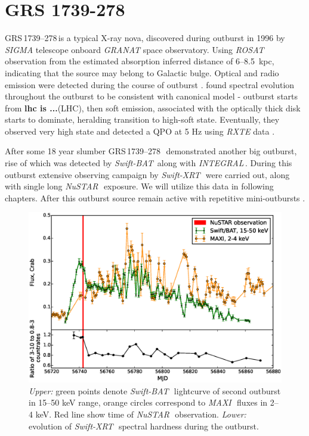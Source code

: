 \documentclass[a4paper,fleqn,usenatbib]{mnras}
\def\grs{{GRS\,1739--278\,}}
\def\swiftx{{\em Swift-XRT\,}}
\def\swiftb{{\em Swift-BAT\,}}
\def\nustar{{\em NuSTAR\,}}
\def\integral{{\em INTEGRAL\,}}
\def\maxi{{\em MAXI\,}}
\begin{document}
\section{GRS 1739-278}

\grs is a typical X-ray nova, discovered during outburst in 1996  \citep{paul96} by {\it SIGMA} \citep{paul91} telescope onboard {\it GRANAT} space observatory.
Using {\it ROSAT} observation from the estimated absorption \citet{greiner96} inferred distance of 6--8.5~kpc, indicating that the source may belong to Galactic bulge. 
Optical and radio emission were detected during the course of outburst \citep{hjellming96,marti97}. 
\citet{borozdin98} found spectral evolution throughout the outburst to be consistent with canonical model - outburst starts from {\bf lhc is ...}(LHC), then soft emission, associated with the optically thick disk starts to dominate, heralding transition to high-soft state. 
Eventually, they observed very high state and detected a QPO at 5 Hz using {\it RXTE} data \citep{borozdin00}.

After some 18 year slumber \grs\ demonstrated another big outburst, rise of which was detected by \swiftb \citep{krimm14_atel} along with \integral \citep{filippova14}. 
During this outburst extensive observing campaign by \swiftx\, were carried out, along with single long \nustar\, exposure. 
We will utilize this data in following chapters. 
After this outburst source remain active with repetitive mini-outbursts \citep{mereminskiy16,yan17}.



\begin{figure}
\centerline{\includegraphics[scale=0.5]{batlc_v06.eps}}
\caption{{\it Upper:} green points denote \swiftb\, lightcurve of second outburst in 15--50 keV range, orange circles correspond to \maxi\, fluxes in 2--4 keV. Red line show time of \nustar\, observation. {\it Lower:} evolution of \swiftx\, spectral hardness during the outburst.} 
\label{fig:batlc}
\end{figure} 
\end{document}
